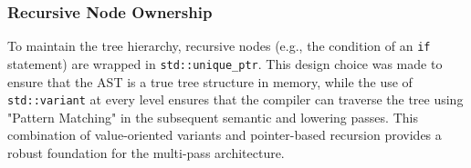\subsubsection{Recursive Node Ownership}

To maintain the tree hierarchy, recursive nodes (e.g., the condition of an \texttt{if} statement) are wrapped
in \texttt{std::unique\_ptr}.
This design choice was made to ensure that the AST is a true tree structure in memory, while the use of
\texttt{std::variant} at every level ensures that the compiler can traverse the tree using "Pattern Matching"
in the subsequent semantic and lowering passes.
This combination of value-oriented variants and pointer-based recursion provides a robust foundation for the
multi-pass architecture.
